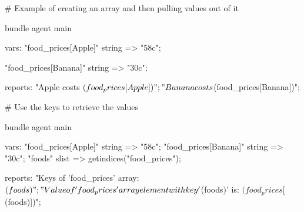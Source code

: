 \begin{codelisting}
\begin{code}
# Example of creating an array and then pulling values out of it

bundle agent main
{
  vars:
      "food_prices[Apple]"
        string =>  "58c";

      "food_prices[Banana]"
        string =>  "30c";

  reports:
      "Apple costs $(food_prices[Apple])";
      "Banana costs $(food_prices[Banana])";
}
\end{code}
\end{codelisting}
\begin{codelisting}
\end{codelisting}
\begin{codelisting}
\begin{code}
# Use the keys to retrieve the values

bundle agent main
{
  vars:
      "food_prices[Apple]"
        string => "58c";
      "food_prices[Banana]"
        string => "30c";
      "foods"
        slist => getindices("food_prices");

  reports:
      "Keys of 'food_prices' array: $(foods)";
      "Value of 'food_prices' array element with key '$(foods)' is: $(food_prices[$(foods)])";
}
\end{code}
\end{codelisting}





